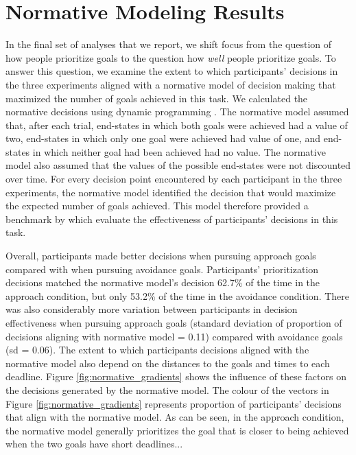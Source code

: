 \documentclass[a4paper,doc,natbib,donotrepeattitle]{apa6}
\begin{document}
\section{Normative Modeling Results}

In the final set of analyses that we report, we shift focus from the question of how people prioritize goals to the question how \textit{well} people prioritize goals. To answer this question, we examine the extent to which participants' decisions in the three experiments aligned with a normative model of decision making that maximized the number of goals achieved in this task. We calculated the normative decisions using dynamic programming \citep{Hutchinson2000}. The normative model assumed that, after each trial, end-states in which both goals were achieved had a value of two, end-states in which only one goal were achieved had value of one, and end-states in which neither goal had been achieved had no value. The normative model also assumed that the values of the possible end-states were not discounted over time. For every decision point encountered by each participant in the three experiments, the normative model identified the decision that would maximize the expected number of goals achieved. This model therefore provided a benchmark by which evaluate the effectiveness of participants' decisions in this task.

Overall, participants made better decisions when pursuing approach goals compared with when pursuing avoidance goals. Participants' prioritization decisions matched the normative model's decision 62.7\% of the time in the approach condition, but only 53.2\% of the time in the avoidance condition. There was also considerably more variation between participants in decision effectiveness when pursuing approach goals (standard deviation of proportion of decisions aligning with normative model = 0.11) compared with avoidance goals (sd = 0.06). The extent to which participants decisions aligned with the normative model also depend on the distances to the goals and times to each deadline. Figure \ref{fig:normative_gradients} shows the influence of these factors on the decisions generated by the normative model. The colour of the vectors in Figure \ref{fig:normative_gradients} represents proportion of participants' decisions that align with the normative model. As can be seen, in the approach condition, the normative model generally prioritizes the goal that is closer to being achieved when the two goals have short deadlines...
\end{document}
